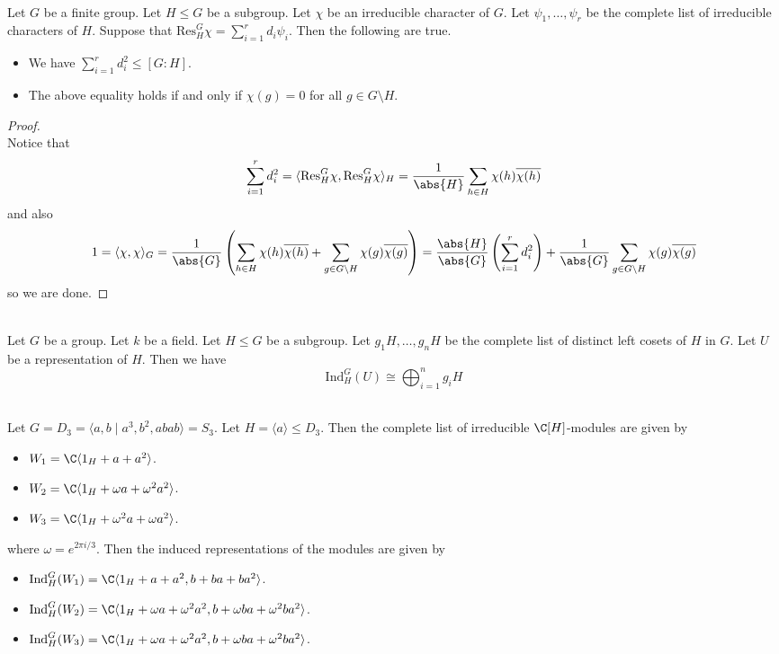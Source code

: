 \documentclass[a4paper]{article}
\begin{document}
\begin{prp}{}{}\\
Let $G$ be a finite group. Let $H\leq G$ be a subgroup. Let $\chi$ be an irreducible character of $G$. Let $\psi_1,\dots,\psi_r$ be the complete list of irreducible characters of $H$. Suppose that $\text{Res}_H^G\chi=\sum_{i=1}^rd_i\psi_i$. Then the following are true. 
\begin{itemize}
\item We have $\sum_{i=1}^rd_i^2\leq[G:H]$. 
\item The above equality holds if and only if $\chi(g)=0$ for all $g\in G\setminus H$. 
\end{itemize}
\begin{proof}\\
Notice that $$\sum_{i=1}^rd_i^2=\langle\text{Res}_H^G\chi,\text{Res}_H^G\chi\rangle_H=\frac{1}{\abs{H}}\sum_{h\in H}\chi(h)\overline{\chi(h)}$$ and also $$1=\langle\chi,\chi\rangle_G=\frac{1}{\abs{G}}\left(\sum_{h\in H}\chi(h)\overline{\chi(h)}+\sum_{g\in G\setminus H}\chi(g)\overline{\chi(g)}\right)=\frac{\abs{H}}{\abs{G}}\left(\sum_{i=1}^rd_i^2\right)+\frac{1}{\abs{G}}\sum_{g\in G\setminus H}\chi(g)\overline{\chi(g)}$$ so we are done. 
\end{proof}
\end{prp}

\begin{lmm}{}{}\\
Let $G$ be a group. Let $k$ be a field. Let $H\leq G$ be a subgroup. Let $g_1H,\dots,g_nH$ be the complete list of distinct left cosets of $H$ in $G$. Let $U$ be a representation of $H$. Then we have $$\text{Ind}_H^G(U)\cong\bigoplus_{i=1}^ng_iH$$
\end{lmm}

\begin{eg}{}{}\\
Let $G=D_3=\langle a,b\;|\;a^3,b^2,abab\rangle=S_3$. Let $H=\langle a\rangle\leq D_3$. Then the complete list of irreducible $\C[H]$-modules are given by 
\begin{itemize}
\item $W_1=\C\langle 1_H+a+a^2\rangle$. 
\item $W_2=\C\langle 1_H+\omega a+\omega^2a^2\rangle$. 
\item $W_3=\C\langle 1_H+\omega^2a+\omega a^2\rangle$. 
\end{itemize}
where $\omega=e^{2\pi i/3}$. 
Then the induced representations of the modules are given by 
\begin{itemize}
\item $\text{Ind}_H^G(W_1)=\C\langle 1_H+a+a^2,b+ba+ba^2\rangle$. 
\item $\text{Ind}_H^G(W_2)=\C\langle 1_H+\omega a+\omega^2a^2,b+\omega ba+\omega^2ba^2\rangle$. 
\item $\text{Ind}_H^G(W_3)=\C\langle 1_H+\omega a+\omega^2a^2,b+\omega ba+\omega^2ba^2\rangle$. 
\end{itemize}
\end{eg}
\end{document}
